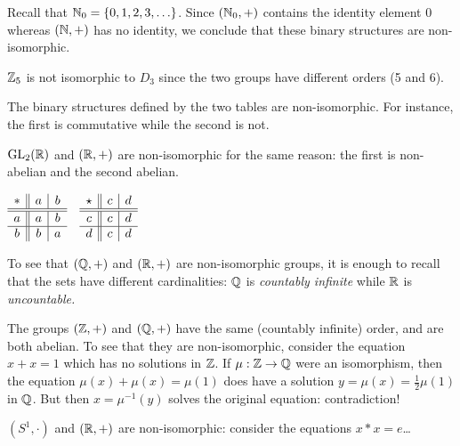 \begin{examples}{}{}
	\exstart Recall that $\mathbb{N}_0=\{0,1,2,3,\ldots\}$. Since $(\mathbb{N}_0,+)$ contains the identity element 0 whereas $(\mathbb{N},+)$ has no identity, we conclude that these binary structures are non-isomorphic.

	\begin{enumerate}\setcounter{enumi}{1}%
	  \item $\mathbb{Z}_5$ is not isomorphic to $D_3$ since the two groups have different orders (5 and 6).
	  
	  \goodbreak
	  
	  \begin{minipage}[t]{0.72\linewidth}\vspace{0pt}
	  	\item The binary structures defined by the two tables are non-isomorphic. For instance, the first is commutative while the second is not.
	  		  
	  	\item $\mathrm{GL}_2(\mathbb{R})$ and $(\mathbb{R},+)$ are non-isomorphic for the same reason: the first is non-abelian and the second abelian.
	  \end{minipage}
	  \hfill
	  \begin{minipage}[t]{0.27\linewidth}\vspace{0pt}
		  \flushright%
		  $\begin{array}[t]{c||c|c}
				* & a & b\\
				\hline\hline a & a & b\\
				\hline b & b & a
		  \end{array}
		  \quad
		  \begin{array}[t]{c||c|c}
				\star & c & d\\
				\hline\hline c & c & d\\
				\hline d & c & d
		  \end{array}$
	  \end{minipage}
	  \par 
	 	
	  
	  \item To see that $(\mathbb{Q},+)$ and $(\mathbb{R},+)$ are non-isomorphic groups, it is enough to recall that the sets have different cardinalities: $\mathbb{Q}$ is \emph{countably infinite} while $\mathbb{R}$ is \emph{uncountable.}


		\item The groups $(\mathbb{Z},+)$ and $(\mathbb{Q},+)$ have the same (countably infinite) order, and are both abelian. To see that they are non-isomorphic, consider the equation $x+x=1$ which has no solutions in $\mathbb{Z}$. If $\mu:\mathbb{Z}\to\mathbb{Q}$ were an isomorphism, then the equation $\mu(x)+\mu(x)=\mu(1)$ does have a solution $y=\mu(x)=\frac 12\mu(1)$ in $\mathbb{Q}$. But then $x=\mu^{-1}(y)$ solves the original equation: contradiction!
 	  
 	  
 	  \item $(S^1,\cdot)$ and $(\mathbb{R},+)$ are non-isomorphic: consider the equations $x*x=e$\ldots
	\end{enumerate}
\end{examples}

